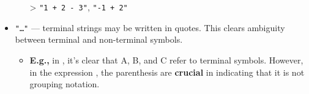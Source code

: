 \begin{Def}
\begin{itemize}
\begin{itemize}
        \item [>] \texttt{"1 + 2 - 3"}, \texttt{"-1 + 2"}
        \end{itemize}
    \item \texttt{"\ldots"} — terminal strings may be written in quotes. This clears ambiguity between terminal and non-terminal symbols.
    \begin{itemize}
        \item \textbf{E.g.,} in , it's clear that A, B, and C refer to terminal symbols. However, in the expression , the parenthesis are \textbf{crucial} in indicating that it is not grouping notation.
    \end{itemize}
\end{itemize}
\end{Def}

\newpage

